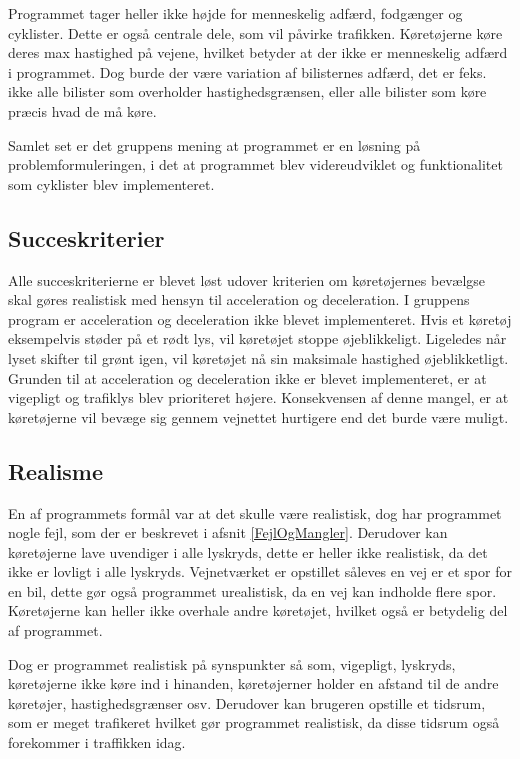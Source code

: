\vspace{5mm}
Programmet tager heller ikke højde for menneskelig adfærd, fodgænger og cyklister. Dette er også centrale dele, som vil påvirke trafikken. Køretøjerne køre deres max hastighed på vejene, hvilket betyder at der ikke er menneskelig adfærd i programmet. Dog burde der være variation af bilisternes adfærd, det er feks. ikke alle bilister som overholder hastighedsgrænsen, eller alle bilister som køre præcis hvad de må køre. 

\vspace{5mm}
Samlet set er det gruppens mening at programmet er en løsning på problemformuleringen, i det at programmet blev videreudviklet og funktionalitet som cyklister blev implementeret.

\subsection{Succeskriterier}
Alle succeskriterierne er blevet løst udover kriterien om køretøjernes bevælgse skal gøres realistisk med hensyn til acceleration og deceleration. I gruppens program er acceleration og deceleration ikke blevet implementeret. Hvis et køretøj eksempelvis støder på et rødt lys, vil køretøjet stoppe øjeblikkeligt. Ligeledes når lyset skifter til grønt igen, vil køretøjet nå sin maksimale hastighed øjeblikketligt. Grunden til at acceleration og deceleration ikke er blevet implementeret, er at vigepligt og trafiklys blev prioriteret højere. Konsekvensen af denne mangel, er at køretøjerne vil bevæge sig gennem vejnettet hurtigere end det burde være muligt.

\subsection{Realisme}
En af programmets formål var at det skulle være realistisk, dog har programmet nogle fejl, som der er beskrevet i afsnit \ref{FejlOgMangler}.  Derudover kan køretøjerne lave uvendiger i alle lyskryds, dette er heller ikke realistisk, da det ikke er lovligt i alle lyskryds. Vejnetværket er opstillet såleves en vej er et spor for en bil, dette gør også programmet urealistisk, da en vej kan indholde flere spor. Køretøjerne kan heller ikke overhale andre køretøjet, hvilket også er betydelig del af programmet. 

\vspace{5mm}
Dog er programmet realistisk på synspunkter så som, vigepligt, lyskryds, køretøjerne ikke køre ind i hinanden, køretøjerner holder en afstand til de andre køretøjer, hastighedsgrænser osv. Derudover kan brugeren opstille et tidsrum, som er meget trafikeret hvilket gør programmet realistisk, da disse tidsrum også forekommer i traffikken idag. 